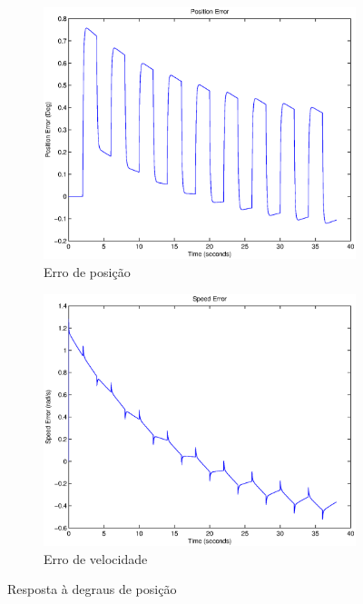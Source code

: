 \documentclass{article}
\begin{document}
\begin{figure}[H]
\begin{subfigure}{0.32\textwidth}
		\includegraphics[width=\linewidth]{matlab/ep6}
		\caption{Erro de posição}
	\end{subfigure}
	\begin{subfigure}{0.32\textwidth}
		\includegraphics[width=\linewidth]{matlab/ew6}
		\caption{Erro de velocidade}
	\end{subfigure}
	\caption{Resposta à degraus de posição}	
	\label{fig:sim6res}
\end{figure}


\end{document}
